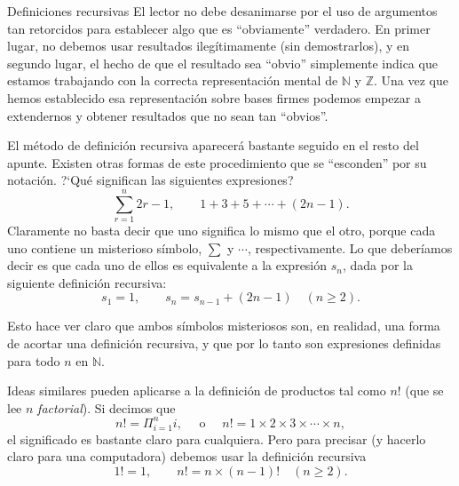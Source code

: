 \documentclass[11pt,spanish,makeidx]{amsbook}
\theoremstyle{definition}
\theoremstyle{remark}
\begin{document}
\begin{section}{Definiciones recursivas}
El lector no debe desanimarse por el uso de argumentos tan retorcidos para establecer algo que es ``obviamente'' verdadero. En primer lugar, no debemos usar resultados ilegítimamente (sin demostrarlos), y en segundo lugar, el hecho de que el resultado sea ``obvio'' simplemente indica que estamos trabajando con la correcta representación mental de $\mathbb N$ y $\mathbb Z$. Una vez que hemos establecido esa representación sobre bases firmes podemos empezar a extendernos y obtener resultados que no sean tan ``obvios''.

El método de definición recursiva aparecerá bastante seguido en el resto del apunte. Existen otras formas de este procedimiento que se ``esconden'' por su notación. ?`Qué significan las siguientes expresiones?
$$
\sum_{r=1}^{n} 2r-1,\qquad 1+3+5+\cdots +(2n-1).
$$
Claramente no basta decir que uno significa lo mismo que el otro, porque cada uno contiene un misterioso símbolo, $\sum$ y $\cdots$, respectivamente. Lo que deberíamos decir es que cada uno de ellos es equivalente a la expresión $s_n$, dada por la siguiente definición recursiva:
$$
s_1= 1, \qquad s_n = s_{n-1} +(2n-1) \quad (n\ge 2).
$$

Esto hace ver claro que ambos símbolos misteriosos son, en realidad, una forma de acortar una definición recursiva, y que por lo tanto son expresiones definidas para todo $n$ en $\mathbb N$.

Ideas similares pueden aplicarse a la definición de productos tal como $n!$ (que se lee $n$ {\it factorial}). Si decimos que
$$
n! = \Pi_{i=1}^n i , \quad \text{ o } \quad n!=1 \times 2 \times 3
\times \cdots \times n,
$$
el significado es bastante claro para cualquiera. Pero para precisar (y hacerlo claro para una computadora) debemos usar la definición recursiva
$$
1!=1,\qquad n!=n \times (n-1)! \quad (n\ge 2).
$$


\end{section}
\end{document}
